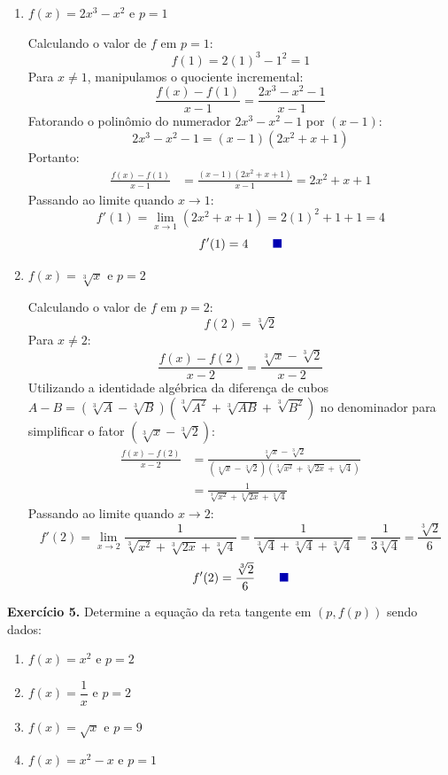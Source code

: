 \documentclass[12pt,a4paper]{article}
\newcommand{\qedsymbolmath}{\tag*{\textcolor{blue!70!black}{\rule{1.6ex}{1.6ex}}}}
\begin{document}
\begin{enumerate}[label=\alph*)]
    \item $f(x) = 2x^3 - x^2$ e $p = 1$

    Calculando o valor de $f$ em $p = 1$:
    \[
    f(1) = 2(1)^3 - 1^2 = 1
    \]
    Para $x \neq 1$, manipulamos o quociente incremental:
    \[
    \frac{f(x) - f(1)}{x - 1} = \frac{2x^3 - x^2 - 1}{x - 1}
    \]
    Fatorando o polinômio do numerador $2x^3 - x^2 - 1$ por $(x - 1)$:
    \[
    2x^3 - x^2 - 1 = (x - 1)(2x^2 + x + 1)
    \]
    Portanto:
    \begin{align*}
        \frac{f(x) - f(1)}{x - 1} &= \frac{(x - 1)(2x^2 + x + 1)}{x - 1} = 2x^2 + x + 1
    \end{align*}
    Passando ao limite quando $x \to 1$:
    \[
    f'(1) = \lim_{x \to 1} (2x^2 + x + 1) = 2(1)^2 + 1 + 1 = 4
    \]
    \begin{equation*}
        f'(1) = 4 \qedsymbolmath
    \end{equation*}

    \item $f(x) = \sqrt[3]{x}$ e $p = 2$

    Calculando o valor de $f$ em $p = 2$:
    \[
    f(2) = \sqrt[3]{2}
    \]
    Para $x \neq 2$:
    \[
    \frac{f(x) - f(2)}{x - 2} = \frac{\sqrt[3]{x} - \sqrt[3]{2}}{x - 2}
    \]
    Utilizando a identidade algébrica da diferença de cubos $A - B = (\sqrt[3]{A} - \sqrt[3]{B})\left(\sqrt[3]{A^2} + \sqrt[3]{AB} + \sqrt[3]{B^2}\right)$ no denominador para simplificar o fator $(\sqrt[3]{x} - \sqrt[3]{2})$:
    \begin{align*}
        \frac{f(x) - f(2)}{x - 2} &= \frac{\sqrt[3]{x} - \sqrt[3]{2}}{(\sqrt[3]{x} - \sqrt[3]{2})\left(\sqrt[3]{x^2} + \sqrt[3]{2x} + \sqrt[3]{4}\right)} \\[0.25cm]
        &= \frac{1}{\sqrt[3]{x^2} + \sqrt[3]{2x} + \sqrt[3]{4}}
    \end{align*}
    Passando ao limite quando $x \to 2$:
    \[
    f'(2) = \lim_{x \to 2} \frac{1}{\sqrt[3]{x^2} + \sqrt[3]{2x} + \sqrt[3]{4}} = \frac{1}{\sqrt[3]{4} + \sqrt[3]{4} + \sqrt[3]{4}} = \frac{1}{3\sqrt[3]{4}} = \frac{\sqrt[3]{2}}{6}
    \]
    \begin{equation*}
        f'(2) = \frac{\sqrt[3]{2}}{6} \qedsymbolmath
    \end{equation*}
\end{enumerate}

\vspace{0.5cm}
\noindent\textbf{Exercício 5.} Determine a equação da reta tangente em $(p, f(p))$ sendo dados:
\begin{enumerate}
    \renewcommand{\theenumi}{\alph{enumi}}
    \renewcommand{\labelenumi}{\theenumi)}
    \item $f(x) = x^2$ e $p = 2$
    \item $f(x) = \dfrac{1}{x}$ e $p = 2$
    \item $f(x) = \sqrt{x}$ e $p = 9$
    \item $f(x) = x^2 - x$ e $p = 1$
\end{enumerate}
\setcounter{equation}{0}
\end{document}

